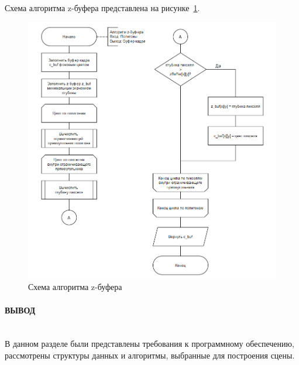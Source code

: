 Схема алгоритма z-буфера представлена на рисунке~\ref{fig:z_buf}.

\begin{figure}[H]
    \centering
    \includegraphics[width=1\linewidth]{images/diograms/z_buf.png}
    \caption{Схема алгоритма z-буфера}
    \label{fig:z_buf}
\end{figure}

\paragraph*{ВЫВОД} ${}$ \\

В данном разделе были представлены требования к программному обеспечению, рассмотрены структуры данных и алгоритмы, выбранные для построения сцены.
